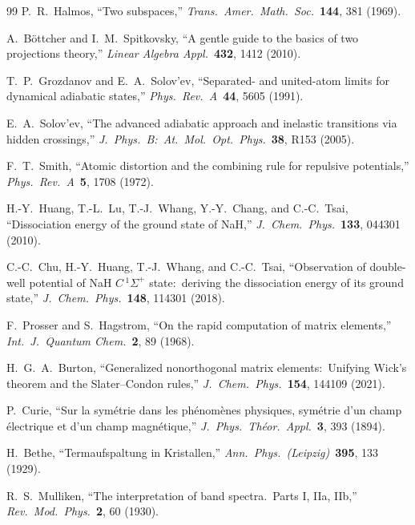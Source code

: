 \documentclass[aps,pra,twocolumn,superscriptaddress,longbibliography]{revtex4-2}
\begin{document}
\begin{thebibliography}{99}
P.~R.~Halmos, ``Two subspaces,''
\textit{Trans.\ Amer.\ Math.\ Soc.}\ \textbf{144}, 381 (1969).

A.~B\"ottcher and I.~M.~Spitkovsky, ``A gentle guide to the basics of two
projections theory,'' \textit{Linear Algebra Appl.}\ \textbf{432}, 1412
(2010).

T.~P.~Grozdanov and E.~A.~Solov'ev, ``Separated- and united-atom limits
for dynamical adiabatic states,'' \textit{Phys.\ Rev.\ A}\ \textbf{44},
5605 (1991).

E.~A.~Solov'ev, ``The advanced adiabatic approach and inelastic
transitions via hidden crossings,'' \textit{J.\ Phys.\ B:\ At.\ Mol.\
Opt.\ Phys.}\ \textbf{38}, R153 (2005).

F.~T.~Smith, ``Atomic distortion and the combining rule for repulsive
potentials,'' \textit{Phys.\ Rev.\ A}\ \textbf{5}, 1708 (1972).

H.-Y.~Huang, T.-L.~Lu, T.-J.~Whang, Y.-Y.~Chang, and C.-C.~Tsai,
``Dissociation energy of the ground state of NaH,''
\textit{J.\ Chem.\ Phys.}\ \textbf{133}, 044301 (2010).

C.-C.~Chu, H.-Y.~Huang, T.-J.~Whang, and C.-C.~Tsai, ``Observation of
double-well potential of NaH $C\,^1\Sigma^+$ state:\ deriving the
dissociation energy of its ground state,''
\textit{J.\ Chem.\ Phys.}\ \textbf{148}, 114301 (2018).

F.~Prosser and S.~Hagstrom, ``On the rapid computation of matrix
elements,'' \textit{Int.\ J.\ Quantum Chem.}\ \textbf{2}, 89 (1968).

H.~G.~A.~Burton, ``Generalized nonorthogonal matrix elements:\ Unifying
Wick's theorem and the Slater--Condon rules,''
\textit{J.\ Chem.\ Phys.}\ \textbf{154}, 144109 (2021).

P.~Curie, ``Sur la sym\'etrie dans les ph\'enom\`enes physiques,
sym\'etrie d'un champ \'electrique et d'un champ magn\'etique,''
\textit{J.\ Phys.\ Th\'eor.\ Appl.}\ \textbf{3}, 393 (1894).

H.~Bethe, ``Termaufspaltung in Kristallen,''
\textit{Ann.\ Phys.\ (Leipzig)}\ \textbf{395}, 133 (1929).

R.~S.~Mulliken, ``The interpretation of band spectra.\ Parts I, IIa, IIb,''
\textit{Rev.\ Mod.\ Phys.}\ \textbf{2}, 60 (1930).


\end{thebibliography}
\end{document}
